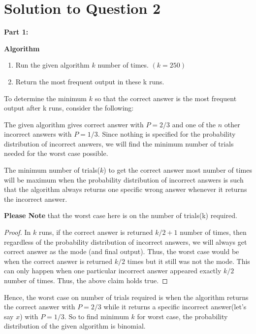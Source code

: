 \documentclass[11pt]{article}
\begin{document}
\newpage

\section{Solution to Question 2}

\textbf{Part 1:}

\textbf{Algorithm}
\begin{enumerate}
	\item Run the given algorithm $k$ number of times. $(k = 250)$
	\item Return the most frequent output in these k runs.
\end{enumerate}
To determine the minimum $k$ so that the correct answer is the most frequent output after k runs, consider the following:

The given algorithm gives correct answer with $P = 2/3$ and one of the $n$ other incorrect answers with $P = 1/3$.
Since nothing is specified for the probability distribution of incorrect answers, we will find the minimum number of trials needed for 
the worst case possible. 

 The minimum number of trials($k$) to get the correct answer most number of times will be maximum when the 
probability distribution of incorrect answers is such that the algorithm always returns one specific wrong answer whenever it returns
the incorrect answer.

\textbf{Please Note} that the worst case here is on the number of trials(k) required.

\begin{proof}
In $k$ runs, if the correct answer is returned $k/2+1$ number of times, then regardless of the probability distribution of incorrect 
answers, we will always get correct answer as the mode (and final output). Thus, the worst case would be when the correct 
answer is returned $k/2$ times but it still was not the mode. This can only happen when one particular incorrect answer appeared exactly 
$k/2$ number of times. \newline
Thus, the above claim holds true.
\end{proof}
Hence, the worst case on number of trials required is when the algorithm returns the correct answer with $P = 2/3$ while it returns a 
specific incorrect answer(let's say $x$) with $P = 1/3$. \newline
So to find minimum $k$ for worst case, the probability distribution of the given algorithm is binomial.
\end{document}
